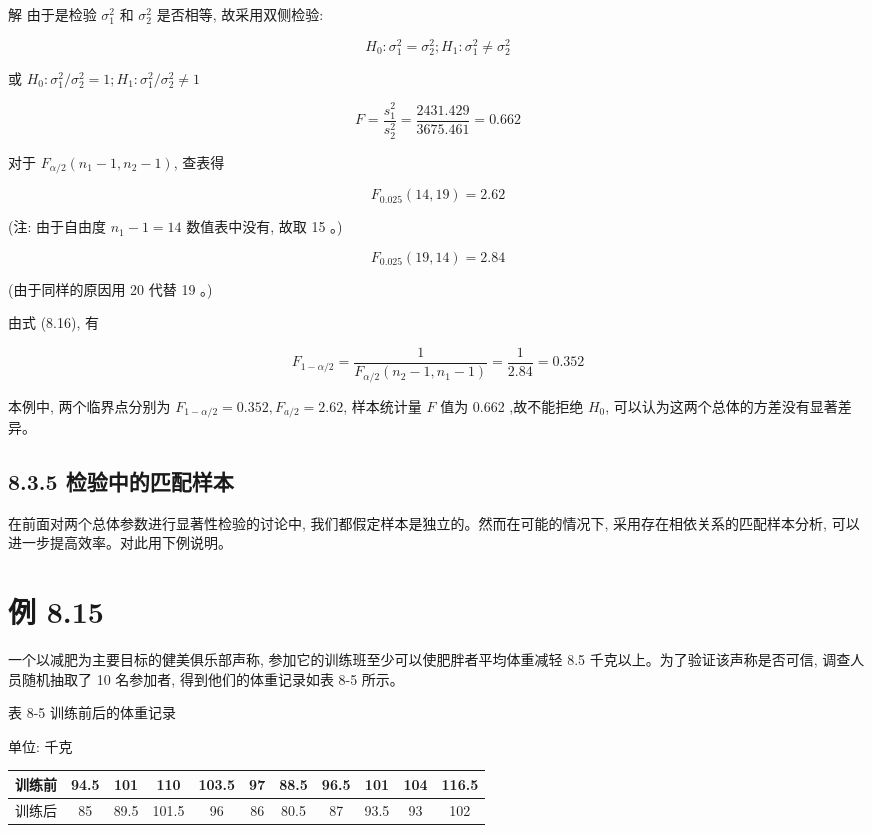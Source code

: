 \documentclass[10pt]{article}
\begin{document}
\begin{CJK*}{UTF8}{bsmi}
解 由于是检验 $\sigma_{1}^{2}$ 和 $\sigma_{2}^{2}$ 是否相等, 故采用双侧检验:

$$
H_{0}: \sigma_{1}^{2}=\sigma_{2}^{2} ; H_{1}: \sigma_{1}^{2} \neq \sigma_{2}^{2}
$$

或 $H_{0}: \sigma_{1}^{2} / \sigma_{2}^{2}=1 ; H_{1}: \sigma_{1}^{2} / \sigma_{2}^{2} \neq 1$

$$
F=\frac{s_{1}^{2}}{s_{2}^{2}}=\frac{2431.429}{3675.461}=0.662
$$

对于 $F_{\alpha / 2}\left(n_{1}-1, n_{2}-1\right)$, 查表得

$$
F_{0.025}(14,19)=2.62
$$

(注: 由于自由度 $n_{1}-1=14$ 数值表中没有, 故取 15 。)

$$
F_{0.025}(19,14)=2.84
$$

(由于同样的原因用 20 代替 19 。)

由式 (8.16), 有

$$
F_{1-\alpha / 2}=\frac{1}{F_{\alpha / 2}\left(n_{2}-1, n_{1}-1\right)}=\frac{1}{2.84}=0.352
$$

本例中, 两个临界点分别为 $F_{1-\alpha / 2}=0.352, F_{a / 2}=2.62$, 样本统计量 $F$ 值为 0.662 ,故不能拒绝 $H_{0}$, 可以认为这两个总体的方差没有显著差异。

\subsection*{8.3.5 检验中的匹配样本}
在前面对两个总体参数进行显著性检验的讨论中, 我们都假定样本是独立的。然而在可能的情况下, 采用存在相依关系的匹配样本分析, 可以进一步提高效率。对此用下例说明。

\section*{例 8.15}
一个以减肥为主要目标的健美俱乐部声称, 参加它的训练班至少可以使肥胖者平均体重减轻 8.5 千克以上。为了验证该声称是否可信, 调查人员随机抽取了 10 名参加者, 得到他们的体重记录如表 8-5 所示。

表 8-5 训练前后的体重记录

单位: 千克

\begin{center}
\begin{tabular}{lcccccccccc}
\hline
训练前 & 94.5 & 101 & 110 & 103.5 & 97 & 88.5 & 96.5 & 101 & 104 & 116.5 \\
\hline
训练后 & 85 & 89.5 & 101.5 & 96 & 86 & 80.5 & 87 & 93.5 & 93 & 102 \\
\hline
\end{tabular}
\end{center}


\end{CJK*}
\end{document}
